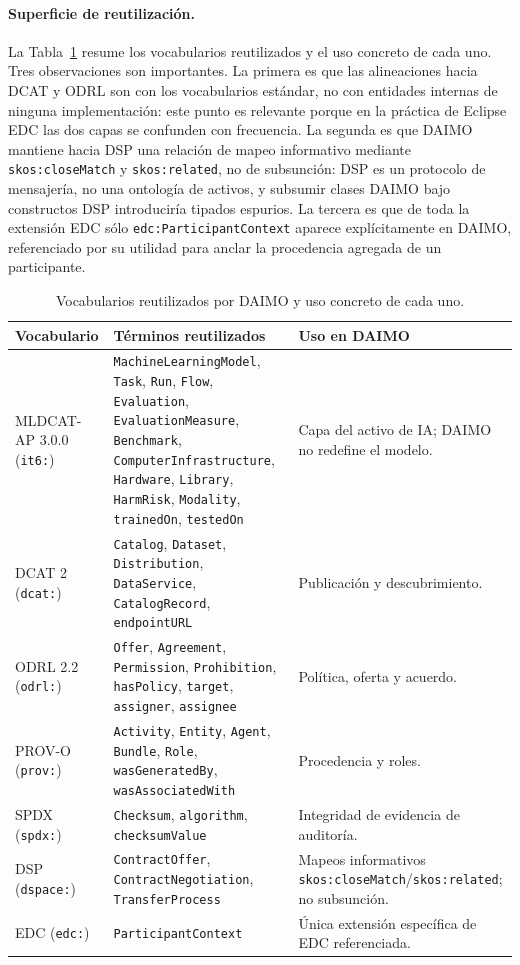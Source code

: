 \documentclass[Afour,sagev,times]{sagej}
\newcommand{\code}[1]{\texttt{#1}}
\begin{document}
\paragraph{Superficie de reutilización.}\label{sec:reuse}

La Tabla~\ref{tab:reuse} resume los vocabularios reutilizados y el uso concreto de cada uno. Tres observaciones son importantes. La primera es que las alineaciones hacia DCAT y ODRL son con los vocabularios estándar, no con entidades internas de ninguna implementación: este punto es relevante porque en la práctica de Eclipse EDC las dos capas se confunden con frecuencia. La segunda es que DAIMO mantiene hacia DSP una relación de mapeo informativo mediante \code{skos:closeMatch} y \code{skos:related}, no de subsunción: DSP es un protocolo de mensajería, no una ontología de activos, y subsumir clases DAIMO bajo constructos DSP introduciría tipados espurios. La tercera es que de toda la extensión EDC sólo \code{edc:ParticipantContext} aparece explícitamente en DAIMO, referenciado por su utilidad para anclar la procedencia agregada de un participante.

\begin{table}[t]
\small\sf\centering
\caption{Vocabularios reutilizados por DAIMO y uso concreto de cada uno.\label{tab:reuse}}
\begin{tabular}{@{}p{2.6cm}p{5cm}p{7cm}@{}}
\toprule
\textbf{Vocabulario} & \textbf{Términos reutilizados} & \textbf{Uso en DAIMO} \\
\midrule
MLDCAT-AP 3.0.0 (\code{it6:}) & \code{MachineLearningModel}, \code{Task}, \code{Run}, \code{Flow}, \code{Evaluation}, \code{EvaluationMeasure}, \code{Benchmark}, \code{ComputerInfrastructure}, \code{Hardware}, \code{Library}, \code{HarmRisk}, \code{Modality}, \code{trainedOn}, \code{testedOn} & Capa del activo de IA; DAIMO no redefine el modelo. \\
DCAT 2 (\code{dcat:}) & \code{Catalog}, \code{Dataset}, \code{Distribution}, \code{DataService}, \code{CatalogRecord}, \code{endpointURL} & Publicación y descubrimiento. \\
ODRL 2.2 (\code{odrl:}) & \code{Offer}, \code{Agreement}, \code{Permission}, \code{Prohibition}, \code{hasPolicy}, \code{target}, \code{assigner}, \code{assignee} & Política, oferta y acuerdo. \\
PROV-O (\code{prov:}) & \code{Activity}, \code{Entity}, \code{Agent}, \code{Bundle}, \code{Role}, \code{wasGeneratedBy}, \code{wasAssociatedWith} & Procedencia y roles. \\
SPDX (\code{spdx:}) & \code{Checksum}, \code{algorithm}, \code{checksumValue} & Integridad de evidencia de auditoría. \\
DSP (\code{dspace:}) & \code{ContractOffer}, \code{ContractNegotiation}, \code{TransferProcess} & Mapeos informativos \code{skos:closeMatch}/\code{skos:related}; no subsunción. \\
EDC (\code{edc:}) & \code{ParticipantContext} & Única extensión específica de EDC referenciada. \\
\bottomrule
\end{tabular}
\end{table}
\end{document}
